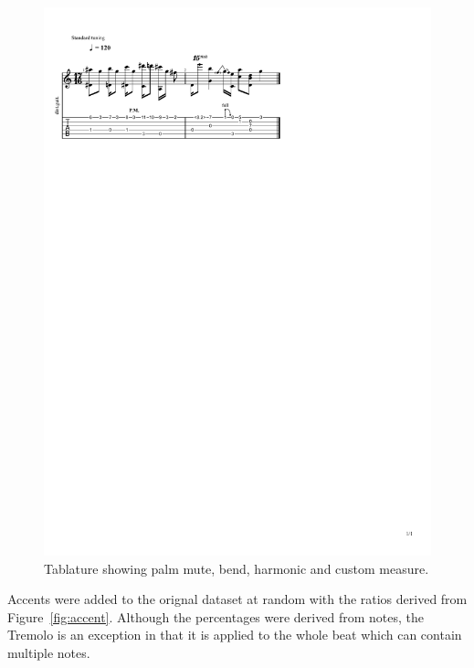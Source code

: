 \documentclass[twoside,11pt]{article}
\begin{document}
\begin{figure}[ht]
\centering
\includegraphics[trim={20 620 200 100}, clip, width=0.6\linewidth]{SCORE_SET.pdf}
\caption{Tablature showing palm mute, bend, harmonic and custom measure.}
\label{fig:gpro}
\end{figure}

Accents were added to the orignal dataset at random with the ratios derived from Figure~\ref{fig:accent}.
Although the percentages were derived from notes, the Tremolo is an exception in that it is applied 
to the whole beat which can contain multiple notes.



\vskip 0.2in

\end{document}
